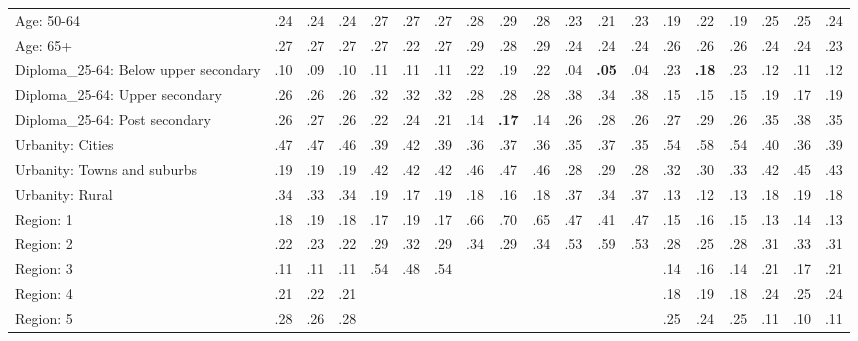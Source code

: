 \begin{tabular}[t]{lcccccccccccccccccc}
Age: 50-64 & .24 & .24 & .24 & .27 & .27 & .27 & .28 & .29 & .28 & .23 & .21 & .23 & .19 & .22 & .19 & .25 & .25 & .24\\
Age: 65+ & .27 & .27 & .27 & .27 & .22 & .27 & .29 & .28 & .29 & .24 & .24 & .24 & .26 & .26 & .26 & .24 & .24 & .23\\
\addlinespace
Diploma\_25-64: Below upper secondary & .10 & .09 & .10 & .11 & .11 & .11 & .22 & .19 & .22 & .04 & \textbf{.05} & .04 & .23 & \textbf{.18} & .23 & .12 & .11 & .12\\
Diploma\_25-64: Upper secondary & .26 & .26 & .26 & .32 & .32 & .32 & .28 & .28 & .28 & .38 & .34 & .38 & .15 & .15 & .15 & .19 & .17 & .19\\
Diploma\_25-64: Post secondary & .26 & .27 & .26 & .22 & .24 & .21 & .14 & \textbf{.17} & .14 & .26 & .28 & .26 & .27 & .29 & .26 & .35 & .38 & .35\\
\addlinespace
Urbanity: Cities & .47 & .47 & .46 & .39 & .42 & .39 & .36 & .37 & .36 & .35 & .37 & .35 & .54 & .58 & .54 & .40 & .36 & .39\\
Urbanity: Towns and suburbs & .19 & .19 & .19 & .42 & .42 & .42 & .46 & .47 & .46 & .28 & .29 & .28 & .32 & .30 & .33 & .42 & .45 & .43\\
Urbanity: Rural & .34 & .33 & .34 & .19 & .17 & .19 & .18 & .16 & .18 & .37 & .34 & .37 & .13 & .12 & .13 & .18 & .19 & .18\\
\addlinespace
Region: 1 & .18 & .19 & .18 & .17 & .19 & .17 & .66 & .70 & .65 & .47 & .41 & .47 & .15 & .16 & .15 & .13 & .14 & .13\\
Region: 2 & .22 & .23 & .22 & .29 & .32 & .29 & .34 & .29 & .34 & .53 & .59 & .53 & .28 & .25 & .28 & .31 & .33 & .31\\
Region: 3 & .11 & .11 & .11 & .54 & .48 & .54 &  &  &  &  &  &  & .14 & .16 & .14 & .21 & .17 & .21\\
Region: 4 & .21 & .22 & .21 &  &  &  &  &  &  &  &  &  & .18 & .19 & .18 & .24 & .25 & .24\\
Region: 5 & .28 & .26 & .28 &  &  &  &  &  &  &  &  &  & .25 & .24 & .25 & .11 & .10 & .11\\
\bottomrule
\end{tabular}